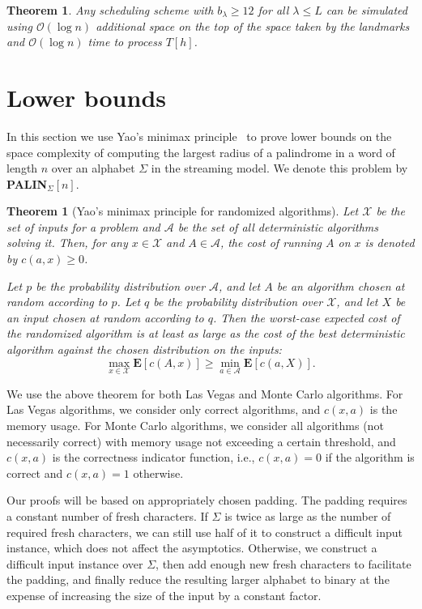 \documentclass{article}[11pt,letter]
\newtheorem{theorem}[definition]{Theorem}
\newcommand{\bigo}{\mathcal{O}}
\newcommand{\ie}{i.e.\xspace}
\newcommand{\head}{h}
\newcommand{\palin}[1][n]{{\bf PALIN}$_{\Sigma}[#1]$\xspace}
\newcommand{\level}{\lambda}
\begin{document}
\begin{theorem}
\label{thm:time_efficient}
Any scheduling scheme with $b_{\level}\geq 12$ for all $\level\leq L$
can be simulated using $\bigo(\log n)$ additional space on the top of the
space taken by the landmarks and $\bigo(\log n)$ time to process $T[\head]$.
\end{theorem}

\section{Lower bounds}
\label{section:lowerbounds}

In this section we use Yao's minimax principle~\cite{Yao77} to prove
lower bounds on the space complexity of computing the largest radius of a palindrome in a word
of length $n$ over an alphabet $\Sigma$ in the streaming model. We denote this problem
by \palin.



\begin{theorem}[Yao's minimax principle for randomized algorithms]
\label{yao}
Let $\mathcal{X}$ be the set of inputs for a problem and $\mathcal{A}$ be the set of all deterministic algorithms solving it. Then,
for any $x \in \mathcal{X}$ and $A \in \mathcal{A}$, the cost of running $A$ on $x$ is denoted by $c(a,x) \ge 0$.

Let $p$ be the probability distribution over $\mathcal{A}$, and let $A$ be an algorithm chosen at random according to $p$. Let $q$ be
the probability distribution over $\mathcal{X}$, and let $X$ be an input chosen at random according to $q$. Then
the worst-case expected cost of the randomized algorithm is at least as large as the cost of the best deterministic algorithm against the chosen
distribution on the inputs:
\[\max_{x \in \mathcal{X}} \mathbf{E}[c(A,x)] \ge \min_{a \in \mathcal{A}} \mathbf{E}[c(a,X)].\]
\end{theorem}

We use the above theorem for both Las Vegas and Monte Carlo algorithms. For Las Vegas algorithms, we consider only correct algorithms, and $c(x,a)$ is the
memory usage.
For Monte Carlo algorithms, we consider all algorithms (not necessarily correct) with memory usage not exceeding a certain threshold,
and $c(x,a)$ is the correctness indicator function, \ie, $c(x,a)=0$ if the algorithm is correct and $c(x,a)=1$ otherwise.

Our proofs will be based on appropriately chosen padding. The padding requires a constant number
of fresh characters.
If $\Sigma$ is twice as large as the number of required fresh characters, we can still use half of
it to construct a difficult input instance, which does not affect the asymptotics. Otherwise,
we construct a difficult input instance over $\Sigma$, then add enough new fresh characters
to facilitate the padding, and finally reduce the resulting larger alphabet to binary at the expense
of increasing the size of the input by a constant factor.
\end{document}
